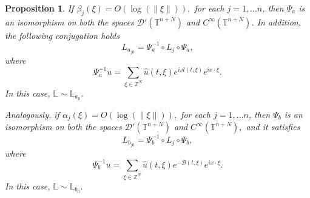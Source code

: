 \documentclass[12pt]{elsarticle}
\newtheorem{proposition}[theorem]{Proposition}
\numberwithin{equation}{section}
\begin{document}
\begin{proposition}\label{prop-isomorphism}
	If $\beta_j(\xi)=O(\log(\|\xi\|)),$ for each $j=1, \ldots n$, then  $\Psi_a$  is an isomorphism on both the spaces $\mathcal{D}'(\mathbb{T}^{n+N})$ and $C^{\infty}(\mathbb{T}^{n+N})$. In addition, the following conjugation holds 
	\begin{equation}\label{Psi-a-1}
	L_{a_{j0}} = \Psi_a^{-1} \circ L_j \circ  \Psi_a,
	\end{equation}
	where 
	\begin{equation}
	\Psi_a^{-1} u =  \sum_{\xi \in \mathbb{Z}^N} \widehat{u}(t, \xi) 
	e^{i \mathcal{A}(t,\xi)} e^{i x \cdot  \xi}.
	\end{equation}
   In this case, $\mathbb{L} \sim \mathbb{L}_{a_0}$.
	
	
	Analogously, if $\alpha_j(\xi)=O(\log(\|\xi\|)),$ for each $j=1, \ldots n$, then $\Psi_b$  is an isomorphism on both the spaces $\mathcal{D}'(\mathbb{T}^{n+N})$ and $C^{\infty}(\mathbb{T}^{n+N}),$ and it	satisfies 
	\begin{equation}\label{Psi-b-1}
	L_{b_{j0}} = \Psi_b^{-1} \circ L_j \circ  \Psi_b,
	\end{equation}
	where 
	\begin{equation}
	\Psi_b^{-1} u =  \sum_{\xi \in \mathbb{Z}^N} \widehat{u}(t, \xi) 
	e^{-\mathcal{B}(t,\xi)} e^{i x \cdot  \xi}.
	\end{equation}
	In this case, $\mathbb{L} \sim \mathbb{L}_{b_0}$.
\end{proposition}
\end{document}
